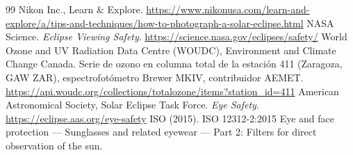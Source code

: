 \documentclass[10pt,a4paper]{article}
\begin{document}
\begin{thebibliography}{99}
Nikon Inc., Learn \& Explore.
\url{https://www.nikonusa.com/learn-and-explore/a/tips-and-techniques/how-to-photograph-a-solar-eclipse.html}
 NASA Science. \emph{Eclipse Viewing Safety}.
\url{https://science.nasa.gov/eclipses/safety/}
 World Ozone and UV Radiation Data Centre (WOUDC), Environment
and Climate Change Canada. Serie de ozono en columna total de la estación 411
(Zaragoza, GAW ZAR), espectrofotómetro Brewer MKIV, contribuidor AEMET.
\url{https://api.woudc.org/collections/totalozone/items?station_id=411}
 American Astronomical Society, Solar Eclipse Task Force. \emph{Eye Safety}. \url{https://eclipse.aas.org/eye-safety}
 ISO (2015). ISO 12312-2:2015 Eye and face protection ---
Sunglasses and related eyewear --- Part 2: Filters for direct observation of
the sun.
\end{thebibliography}
\end{document}
